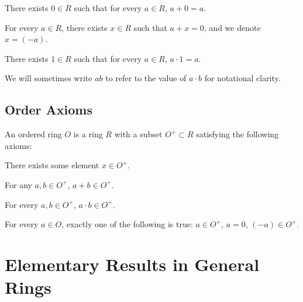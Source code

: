 \begin{axiom}\label{add-identity}
    There exists $0 \in R$ such that for every $a \in R$, $a+0 = a$.
\end{axiom}

\begin{axiom}\label{add-inverses}
    For every $a \in R$, there exists $x \in R$ such that $a + x = 0$, and we denote $x = (-a)$. 
\end{axiom}

\begin{axiom}\label{mult-identity}
    There exists $1 \in R$ such that for every $a \in R$, $a \cdot 1 = a$.
\end{axiom}

We will sometimes write $ab$ to refer to the value of $a \cdot b$ for notational clarity.





\subsection{Order Axioms}

\begin{definition}\label{ordered-ring}
An ordered ring $O$ is a ring $R$ with a subset $O^+ \subset R$ satisfying the following axioms:
\end{definition}

\begin{axiom}\label{positive-nonempty}
    There exists some element $x \in O^+$.
\end{axiom}

\begin{axiom}\label{pos-add-closure}
    For any $a, b \in O^+$, $a+b \in O^+$.
\end{axiom}

\begin{axiom}\label{pos-mult-closure}
     For every $a, b \in O^+$, $a \cdot b \in O^+$.
\end{axiom}

\begin{axiom}[Trichotomy]\label{trichotomy}
    For every $a \in O$, exactly one of the following is true: $a \in O^+$, $a = 0$, $(-a) \in O^+$.
\end{axiom}

\newpage
\section{Elementary Results in General Rings}

